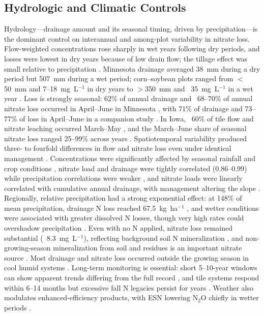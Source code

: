 \subsection{Hydrologic and Climatic Controls}

Hydrology---drainage amount and its seasonal timing, driven by precipitation---is the dominant control on interannual and among-plot variability in nitrate loss. Flow-weighted concentrations rose sharply in wet years following dry periods, and losses were lowest in dry years because of low drain flow; the tillage effect was small relative to precipitation \parencite{RANDALL1995}. Minnesota drainage averaged 38~mm during a dry period but 507~mm during a wet period; corn--soybean plots ranged from $<$50~mm and 7--18~mg~L$^{-1}$ in dry years to $>$350~mm and ~35~mg~L$^{-1}$ in a wet year \parencite{Randall2001}. Loss is strongly seasonal: 62\% of annual drainage and ~68--70\% of annual nitrate loss occurred in April--June in Minnesota \parencite{Randall2003}, with 71\% of drainage and 73--77\% of loss in April--June in a companion study \parencite{Randall2005}. In Iowa, ~60\% of tile flow and nitrate leaching occurred March--May \parencite{Bakhsh2007}, and the March--June share of seasonal nitrate loss ranged 25--99\% across years \parencite{Bakhsh2010}. Spatiotemporal variability produced three- to fourfold differences in flow and nitrate loss even under identical management \parencite{Bakhsh2010}. Concentrations were significantly affected by seasonal rainfall and crop conditions \parencite{Bakhsh2005}, nitrate load and drainage were tightly correlated (0.86--0.99) while precipitation correlations were weaker \parencite{Masri2024}, and nitrate loads were linearly correlated with cumulative annual drainage, with management altering the slope \parencite{OBrien2022}. Regionally, relative precipitation had a strong exponential effect: at 148\% of mean precipitation, drainage N loss reached 67.5~kg~ha$^{-1}$ \parencite{Zhao2016}, and wetter conditions were associated with greater dissolved N losses, though very high rates could overshadow precipitation \parencite{Christianson2015b}. Even with no N applied, nitrate loss remained substantial (~8.3~mg~L$^{-1}$), reflecting background soil N mineralization \parencite{Waring2022}, and non-growing-season mineralization from soil and residues is an important nitrate source \parencite{Gentry2024}. Most drainage and nitrate loss occurred outside the growing season in cool humid systems \parencite{Gordon2005}. Long-term monitoring is essential: short 5--10-year windows can show apparent trends differing from the full record \parencite{Clifford2023}, and tile systems respond within 6--14 months but excessive fall N legacies persist for years \parencite{Jaynes2015}. Weather also modulates enhanced-efficiency products, with ESN lowering N$_2$O chiefly in wetter periods \parencite{Menegaz2025}.

